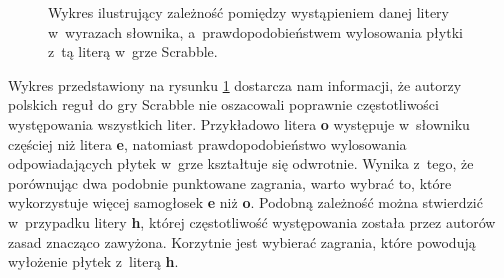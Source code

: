 \documentclass[a4paper,twocolumn,12pt]{article}
\begin{document}
\begin{figure}[ht!]
\begin{center}
		\caption{Wykres ilustrujący zależność pomiędzy wystąpieniem danej litery w~wyrazach słownika, a~prawdopodobieństwem wylosowania płytki z~tą literą w~grze Scrabble.}
		\label{fig:letter_probability_distribution}
	\end{center}
\end{figure}

Wykres przedstawiony na rysunku \ref{fig:letter_probability_distribution} dostarcza nam informacji, że autorzy polskich reguł do gry Scrabble nie oszacowali poprawnie częstotliwości występowania wszystkich liter. Przykładowo litera \textbf{o} występuje w~słowniku częściej niż litera \textbf{e}, natomiast prawdopodobieństwo wylosowania odpowiadających płytek w~grze kształtuje się odwrotnie. Wynika z~tego, że porównując dwa podobnie punktowane zagrania, warto wybrać to, które wykorzystuje więcej samogłosek \textbf{e} niż \textbf{o}. Podobną zależność można stwierdzić w~przypadku litery \textbf{h}, której częstotliwość występowania została przez autorów zasad znacząco zawyżona. Korzytnie jest wybierać zagrania, które powodują wyłożenie płytek z~literą \textbf{h}.
\end{document}
